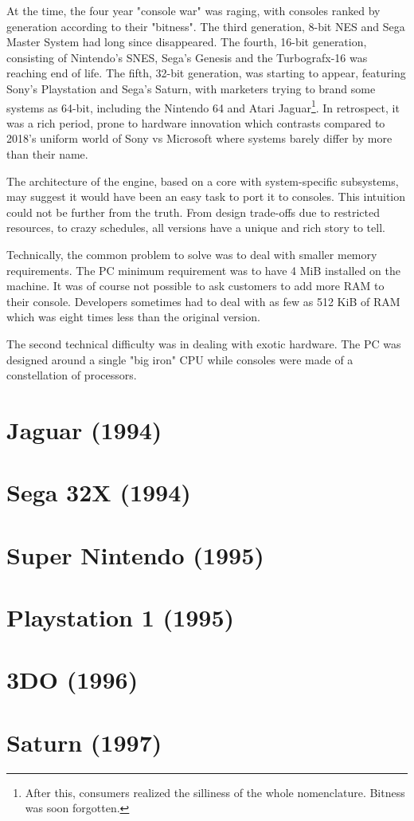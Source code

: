 At the time, the four year "console war" was raging, with consoles ranked by generation according to their "bitness". The third generation, 8-bit NES and Sega Master System had long since disappeared. The fourth, 16-bit generation, consisting of Nintendo's SNES, Sega's Genesis and the Turbografx-16 was reaching end of life. The fifth, 32-bit generation, was starting to appear, featuring Sony's Playstation and Sega's Saturn, with marketers trying to brand some systems as 64-bit, including the Nintendo 64 and Atari Jaguar\footnote{After this, consumers realized the silliness of the whole nomenclature. Bitness was soon forgotten.}. In retrospect, it was a rich period, prone to hardware innovation which contrasts compared to 2018's uniform world of Sony vs Microsoft where systems barely differ by more than their name.\\
\par
The architecture of the \doom{} engine, based on a core with system-specific subsystems, may suggest it would have been an easy task to port it to consoles. This intuition could not be further from the truth. From design trade-offs due to restricted resources, to crazy schedules, all versions have a unique and rich story to tell.\\
\par
Technically, the common problem to solve was to deal with smaller memory requirements. The PC minimum requirement was to have 4 MiB installed on the machine. It was of course not possible to ask customers to add more RAM to their console. Developers sometimes had to deal with as few as 512 KiB of RAM which was eight times less than the original version.\\
\par
The second technical difficulty was in dealing with exotic hardware. The PC was designed around a single "big iron" CPU while consoles were made of a constellation of processors.


\section{Jaguar (1994)}
 

\section{Sega 32X (1994)}
 

\section{Super Nintendo (1995)}


\section{Playstation 1 (1995)}


\section{3DO (1996)}


\section{Saturn (1997)}


